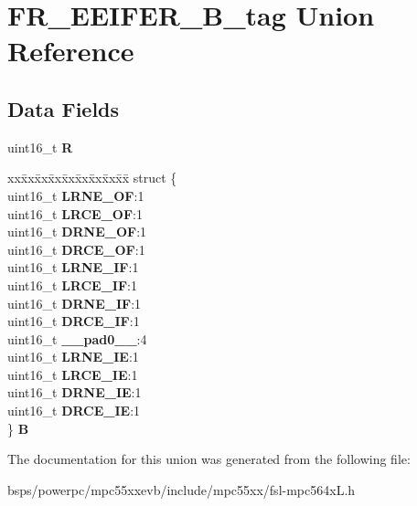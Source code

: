 \hypertarget{unionFR__EEIFER__16B__tag}{}\section{F\+R\+\_\+\+E\+E\+I\+F\+E\+R\+\_\+B\+\_\+tag Union Reference}
\label{unionFR__EEIFER__16B__tag}
\subsection*{Data Fields}
\begin{DoxyCompactItemize}
\item 
\mbox{\label{unionFR__EEIFER__16B__tag_a174172d1e31c9f2b1a25c45f98e4cecf}} 
uint16\+\_\+t {\bfseries R}
\item 
\mbox{\label{unionFR__EEIFER__16B__tag_a4a211a2ba053b201e1a67d05584a81ab}} 
\begin{tabbing}
xx\=xx\=xx\=xx\=xx\=xx\=xx\=xx\=xx\=\kill
struct \{\\
\>uint16\_t {\bfseries LRNE\_OF}:1\\
\>uint16\_t {\bfseries LRCE\_OF}:1\\
\>uint16\_t {\bfseries DRNE\_OF}:1\\
\>uint16\_t {\bfseries DRCE\_OF}:1\\
\>uint16\_t {\bfseries LRNE\_IF}:1\\
\>uint16\_t {\bfseries LRCE\_IF}:1\\
\>uint16\_t {\bfseries DRNE\_IF}:1\\
\>uint16\_t {\bfseries DRCE\_IF}:1\\
\>uint16\_t {\bfseries \_\_pad0\_\_}:4\\
\>uint16\_t {\bfseries LRNE\_IE}:1\\
\>uint16\_t {\bfseries LRCE\_IE}:1\\
\>uint16\_t {\bfseries DRNE\_IE}:1\\
\>uint16\_t {\bfseries DRCE\_IE}:1\\
\} {\bfseries B}\\

\end{tabbing}\end{DoxyCompactItemize}


The documentation for this union was generated from the following file\+:\begin{DoxyCompactItemize}
\item 
bsps/powerpc/mpc55xxevb/include/mpc55xx/fsl-\/mpc564x\+L.\+h\end{DoxyCompactItemize}
